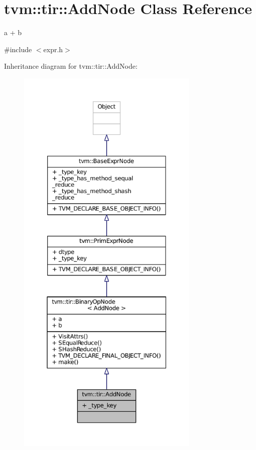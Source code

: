 \hypertarget{classtvm_1_1tir_1_1AddNode}{}\section{tvm\+:\+:tir\+:\+:Add\+Node Class Reference}
\label{classtvm_1_1tir_1_1AddNode}


a + b  




{\ttfamily \#include $<$expr.\+h$>$}



Inheritance diagram for tvm\+:\+:tir\+:\+:Add\+Node\+:
\nopagebreak
\begin{figure}[H]
\begin{center}
\leavevmode
\includegraphics[height=550pt]{classtvm_1_1tir_1_1AddNode__inherit__graph}
\end{center}
\end{figure}


